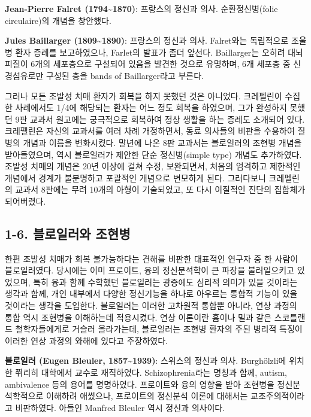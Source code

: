 \documentclass[
]{article}
\begin{document}
\textbf{Jean-Pierre Falret (1794\textasciitilde1870)}: 프랑스의 정신과
의사. 순환정신병(folie circulaire)의 개념을 창안했다.

\textbf{Jules Baillarger (1809\textasciitilde1890)}: 프랑스의 정신과
의사. Falret와는 독립적으로 조울병 환자 증례를 보고하였으나, Farlet의
발표가 좀더 앞선다. Baillarger는 오히려 대뇌피질이 6개의 세포층으로
구설되어 있음을 발견한 것으로 유명하며, 6개 세포층 중 신경섬유로만
구성된 층을 bands of Baillarger라고 부른다.

그러나 모든 조발성 치매 환자가 회복을 하지 못했던 것은 아니었다.
크레펠린이 수집한 사례에서도 1/4에 해당되는 환자는 어느 정도 회복을
하였으며, 그가 완성하지 못했던 9판 교과서 원고에는 궁극적으로 회복하여
정상 생활을 하는 증례도 소개되어 있다. 크레펠린은 자신의 교과서를 여러
차례 개정하면서, 동료 의사들의 비판을 수용하여 질병의 개념과 이름을
변화시켰다. 말년에 나온 8판 교과서는 블로일러의 조현병 개념을
받아들였으며, 역시 블로일러가 제안한 단순 정신병(simple type) 개념도
추가하였다. 조발성 치매의 개념은 20년 이상에 걸쳐 수정, 보완되면서,
처음의 엄격하고 제한적인 개념에서 경계가 불분명하고 포괄적인 개념으로
변모하게 된다. 그러다보니 크레펠린의 교과서 8판에는 무려 10개의 아형이
기술되었고, 또 다시 이질적인 진단의 집합체가 되어버렸다.

\hypertarget{bleuler}{%
\subsection{1-6. 블로일러와 조현병}\label{bleuler}}

한편 조발성 치매가 회복 불가능하다는 견해를 비판한 대표적인 연구자 중 한
사람이 블로일러였다. 당시에는 이미 프로이트, 융의 정신분석학이 큰 파장을
불러일으키고 있었으며, 특히 융과 함께 수학했던 블로일러는 광증에도
심리적 의미가 있을 것이라는 생각과 함께, 개인 내부에서 다양한 정신기능을
하나로 아우르는 통합적 기능이 있을 것이라는 생각을 도입한다. 블로일러는
이러한 고차원적 통합뿐 아니라, 연상 과정의 통합 역시 조현병을 이해하는데
적용시켰다. 연상 이론이란 흄이나 밀과 같은 스코틀랜드 철학자들에게로
거슬러 올라가는데, 블로일러는 조현병 환자의 주된 병리적 특징이 이러한
연상 과정의 와해에 있다고 주장하였다.

\textbf{블로일러 (Eugen Bleuler, 1857\textasciitilde1939)}: 스위스의
정신과 의사. Burghölzli에 위치한 쮜리히 대학에서 교수로 재직하였다.
Schizophrenia라는 명칭과 함께, autism, ambivalence 등의 용어를
명명하였다. 프로이트와 융의 영향을 받아 조현병을 정신분석학적으로
이해하려 애썼으나, 프로이트의 정신분석 이론에 대해서는 교조주의적이라고
비판하였다. 아들인 Manfred Bleuler 역시 정신과 의사이다.
\end{document}
